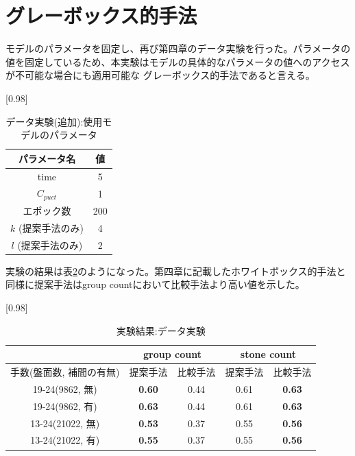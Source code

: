 \section{グレーボックス的手法}
\label{sec:gray}
モデルのパラメータを固定し、再び第四章のデータ実験を行った。パラメータの値を固定しているため、本実験はモデルの具体的なパラメータの値へのアクセスが不可能な場合にも適用可能な
グレーボックス的手法であると言える。
\begin{table}[H]
	\caption{データ実験(追加):使用モデルのパラメータ}
	\centering
	\scalebox{0.98}[0.98]{
		\begin{tabular}{c|c}
			パラメータ名 & 値 \\ \hline
			time    & 5 \\ 
			$C_{puct}$    & 1 \\
			エポック数 & 200 \\
			$k$ (提案手法のみ)     & 4 \\
			$l$ (提案手法のみ)     & 2 \\
		\end{tabular}
	}
	\label{table:param-data-extra}
\end{table}

実験の結果は表\ref{table:result-offline}のようになった。第四章に記載したホワイトボックス的手法と同様に提案手法はgroup countにおいて比較手法より高い値を示した。
\begin{table}[H]
	\caption{実験結果:データ実験}
	\centering
	\scalebox{0.98}[0.98]{
		\begin{tabular}{c|c|c|c|c}
			\multicolumn{1}{c}{} & \multicolumn{2}{|c|}{group count} 
			& \multicolumn{2}{c|}{stone count}\\ \hline \hline
			手数(盤面数, 補間の有無)    & 提案手法 & 比較手法 & 提案手法 & 比較手法 \\ \hline
			19-24(9862, 無)    & \bf{0.60} & 0.44 & 0.61 & \bf{0.63} \\
			19-24(9862, 有)    & \bf{0.63} & 0.44 & 0.61 & \bf{0.63}  \\
			13-24(21022, 無)   & \bf{0.53} & 0.37 & 0.55 & \bf{0.56}  \\
			13-24(21022, 有)   & \bf{0.55} & 0.37 & 0.55 & \bf{0.56}  \\
		\end{tabular}
	}
	\label{table:result-offline}
\end{table}
